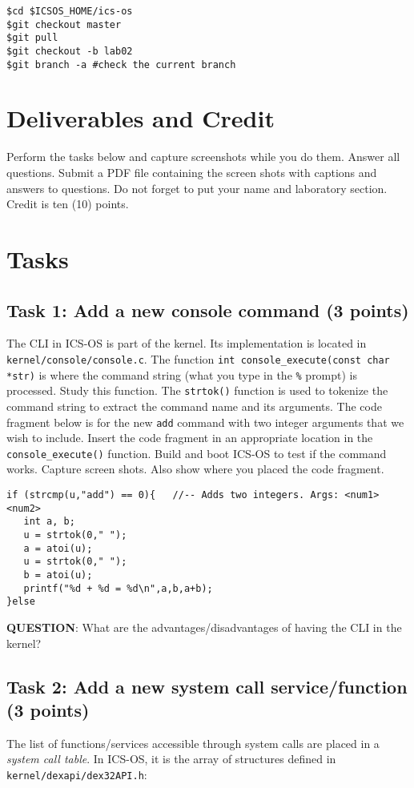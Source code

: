 \documentclass[a4paper, 11pt,oneside]{article}
\begin{document}
\begin{verbatim}
$cd $ICSOS_HOME/ics-os
$git checkout master
$git pull
$git checkout -b lab02
$git branch -a #check the current branch
\end{verbatim}


\section{Deliverables and Credit}
Perform the tasks below and capture screenshots while you do them. Answer
all questions. Submit a PDF file containing the screen shots with captions
and answers to questions. Do not forget to put your name and laboratory
section.  Credit is ten (10) points.

\section{Tasks}

\subsection*{Task 1: Add a new console command (3 points)} 
The CLI in ICS-OS is part of the kernel. Its implementation is located in
\texttt{kernel/console/console.c}. The function \texttt{int 
console\_execute(const char *str)} is where the command string (what you type
in the \texttt{\%} prompt) is processed. Study this function. The 
\texttt{strtok()} function is used to tokenize the command string to extract
the command name and its arguments. The code fragment below is for the new
\texttt{add} command with two integer arguments that we wish to include.
Insert the code fragment in an appropriate location in the 
\texttt{console\_execute()} function. Build and boot ICS-OS to test if the 
command works. Capture screen shots. Also show where you placed the code
fragment. 

\begin{verbatim}
if (strcmp(u,"add") == 0){   //-- Adds two integers. Args: <num1> <num2> 
   int a, b; 
   u = strtok(0," "); 
   a = atoi(u);
   u = strtok(0," "); 
   b = atoi(u); 
   printf("%d + %d = %d\n",a,b,a+b); 
}else
\end{verbatim}

\textbf{QUESTION}: What are the advantages/disadvantages of having the CLI in
the kernel?

\subsection*{Task 2: Add a new system call service/function (3 points)}
The list of functions/services accessible through system calls are placed in a
\textit{system call table}. In ICS-OS, it is the array of structures 
defined in \texttt{kernel/dexapi/dex32API.h}: 
\end{document}
